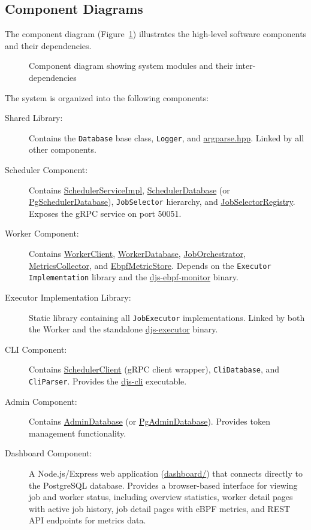 \subsection{Component Diagrams}

The component diagram (Figure~\ref{fig:component-diagram}) illustrates the high-level software components and their dependencies.

\begin{figure}[htbp]
	\centering
	\caption{Component diagram showing system modules and their inter-dependencies}
	\label{fig:component-diagram}
\end{figure}

The system is organized into the following components:

\begin{description}
	\item[Shared Library:] Contains the \texttt{Database} base class, \texttt{Logger}, and \url{argparse.hpp}. Linked by all other components.

	\item[Scheduler Component:] Contains \url{SchedulerServiceImpl}, \url{SchedulerDatabase} (or \url{PgSchedulerDatabase}), \texttt{JobSelector} hierarchy, and \url{JobSelectorRegistry}. Exposes the gRPC service on port 50051.

	\item[Worker Component:] Contains \url{WorkerClient}, \url{WorkerDatabase}, \url{JobOrchestrator}, \url{MetricsCollector}, and \url{EbpfMetricStore}. Depends on the \texttt{Executor Implementation} library and the \url{djs-ebpf-monitor} binary.

	\item[Executor Implementation Library:] Static library containing all \texttt{JobExecutor} implementations. Linked by both the Worker and the standalone \url{djs-executor} binary.

	\item[CLI Component:] Contains \url{SchedulerClient} (gRPC client wrapper), \texttt{CliDatabase}, and \texttt{CliParser}. Provides the \url{djs-cli} executable.

	\item[Admin Component:] Contains \url{AdminDatabase} (or \url{PgAdminDatabase}). Provides token management functionality.

	\item[Dashboard Component:] A Node.js/Express web application (\url{dashboard/}) that connects directly to the PostgreSQL database. Provides a browser-based interface for viewing job and worker status, including overview statistics, worker detail pages with active job history, job detail pages with eBPF metrics, and REST API endpoints for metrics data.


\end{description}
